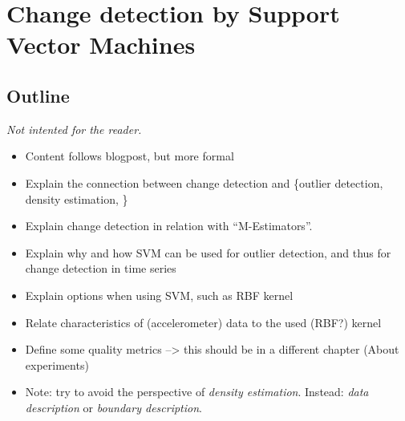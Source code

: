 
\chapter{Change detection by Support Vector Machines}

\label{Chapter3} %


\section{Outline}
\emph{Not intented for the reader.}
\begin{itemize}
  \item Content follows blogpost, but more formal
  \item Explain the connection between change detection and \{outlier detection, density estimation, \etc\}
  \item Explain change detection in relation with ``M-Estimators''.
  \item Explain why and how SVM can be used for outlier detection, and thus for change detection in time series
  \item Explain options when using SVM, such as RBF kernel
  \item Relate characteristics of (accelerometer) data to the used (RBF?) kernel
  \item Define some quality metrics --> this should be in a different chapter (About experiments)
  \item Note: try to avoid the perspective of \emph{density estimation}. Instead: \emph{data description} or \emph{boundary description}.
\end{itemize}






